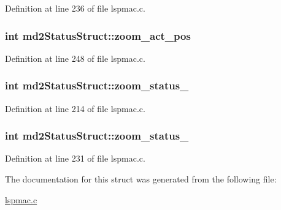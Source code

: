 Definition at line 236 of file lspmac.\-c.

\hypertarget{structmd2StatusStruct_a920b80e9f5f08aedac3ad541d5ffc8ae}{
\subsubsection[{zoom\-\_\-act\-\_\-pos}]{\setlength{\rightskip}{0pt plus 5cm}int md2\-Status\-Struct\-::zoom\-\_\-act\-\_\-pos}}\label{structmd2StatusStruct_a920b80e9f5f08aedac3ad541d5ffc8ae}


Definition at line 248 of file lspmac.\-c.

\hypertarget{structmd2StatusStruct_af28e978b761dc07eefed3971547cfd4d}{
\subsubsection[{zoom\-\_\-status\-\_\-1}]{\setlength{\rightskip}{0pt plus 5cm}int md2\-Status\-Struct\-::zoom\-\_\-status\-\_}}\label{structmd2StatusStruct_af28e978b761dc07eefed3971547cfd4d}


Definition at line 214 of file lspmac.\-c.

\hypertarget{structmd2StatusStruct_a34e4200315a083deb8a970e21bbbe277}{
\subsubsection[{zoom\-\_\-status\-\_\-2}]{\setlength{\rightskip}{0pt plus 5cm}int md2\-Status\-Struct\-::zoom\-\_\-status\-\_}}\label{structmd2StatusStruct_a34e4200315a083deb8a970e21bbbe277}


Definition at line 231 of file lspmac.\-c.



The documentation for this struct was generated from the following file\-:\begin{DoxyCompactItemize}
\item 
\hyperlink{lspmac_8c}{lspmac.\-c}\end{DoxyCompactItemize}
